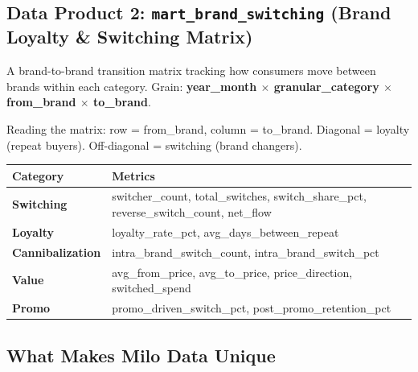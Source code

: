 \documentclass[11pt,a4paper]{article}
\begin{document}
\subsection{Data Product 2: \texttt{mart\_brand\_switching} (Brand Loyalty \& Switching Matrix)}

\begin{categorybox}
A brand-to-brand transition matrix tracking how consumers move between brands within each category. Grain: \textbf{year\_month $\times$ granular\_category $\times$ from\_brand $\times$ to\_brand}.

\vspace{0.3em}
{\small Reading the matrix: row = from\_brand, column = to\_brand. Diagonal = loyalty (repeat buyers). Off-diagonal = switching (brand changers).}

\vspace{0.5em}
\renewcommand{\arraystretch}{1.3}
\begin{tabularx}{\textwidth}{L{2.8cm} L{10.2cm}}
\toprule
{}
\textbf{\color{white}Category} & \textbf{\color{white}Metrics} \\
\midrule
\textbf{Switching} & switcher\_count, total\_switches, switch\_share\_pct, reverse\_switch\_count, net\_flow \\
\textbf{Loyalty} & loyalty\_rate\_pct, avg\_days\_between\_repeat \\
\textbf{Cannibalization} & intra\_brand\_switch\_count, intra\_brand\_switch\_pct \\
\textbf{Value} & avg\_from\_price, avg\_to\_price, price\_direction, switched\_spend \\
\textbf{Promo} & promo\_driven\_switch\_pct, post\_promo\_retention\_pct \\
\bottomrule
\end{tabularx}
\end{categorybox}

\subsection{What Makes Milo Data Unique}
\end{document}
